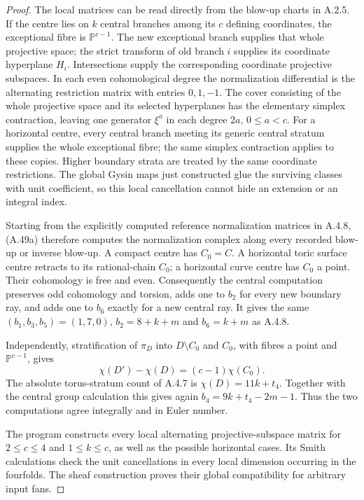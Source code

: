 \begin{proof}
The local matrices can be read directly from the
blow-up charts in A.2.5. If the centre lies on $k$
central branches among its $c$ defining coordinates,
the exceptional fibre is $\mathbb P^{c-1}$. The new
exceptional branch supplies that whole projective
space; the strict transform of old branch $i$
supplies its coordinate hyperplane $H_i$.
Intersections supply the corresponding coordinate
projective subspaces. In each even cohomological
degree the normalization differential is the
alternating restriction matrix with entries
$0,1,-1$. The cover consisting of the whole
projective space and its selected hyperplanes
has the elementary simplex contraction, leaving
one generator $\xi^a$ in each degree $2a$,
$0\leq a<c$. For a horizontal centre, every
central branch meeting its generic central
stratum supplies the whole exceptional fibre;
the same simplex contraction applies to these
copies. Higher boundary strata are treated by
the same coordinate restrictions. The global
Gysin maps just constructed glue the surviving
classes with unit coefficient, so this local
cancellation cannot hide an extension or an
integral index.

Starting from the explicitly computed reference
normalization matrices in A.4.8, (A.49a) therefore
computes the normalization complex along every
recorded blow-up or inverse blow-up. A compact
centre has $C_0=C$. A horizontal toric surface
centre retracts to its rational-chain $C_0$;
a horizontal curve centre has $C_0$ a point.
Their cohomology is free and even. Consequently
the central computation preserves odd cohomology
and torsion, adds one to $b_2$ for every new
boundary ray, and adds one to $b_6$ exactly for
a new central ray. It gives the same
$(b_1,b_3,b_5)=(1,7,0)$,
$b_2=8+k+m$ and $b_6=k+m$ as A.4.8.

Independently, stratification of $\pi_D$ into
$D\setminus C_0$ and $C_0$, with fibres a point
and $\mathbb P^{c-1}$, gives
\[
 \chi(D')-\chi(D)=(c-1)\chi(C_0).
\]
The absolute torus-stratum count of A.4.7 is
$\chi(D)=11k+t_4$. Together with the central
group calculation this gives again
$b_4=9k+t_4-2m-1$. Thus the two computations
agree integrally and in Euler number.

The program 
constructs every local alternating projective-subspace
matrix for $2\leq c\leq4$ and $1\leq k\leq c$,
as well as the possible horizontal cases. Its
Smith calculations check the unit cancellations
in every local dimension occurring in the
fourfolds. The sheaf construction proves their
global compatibility for arbitrary input fans.
\end{proof}
